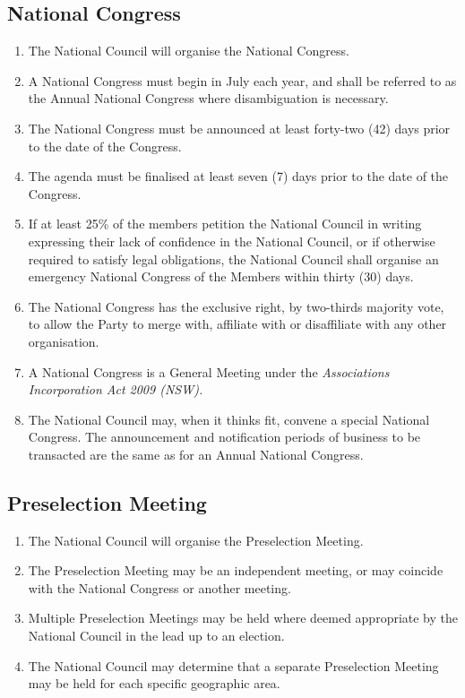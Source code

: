 \documentclass[a4paper,titlepage,8.5pt]{article}
\begin{document}
\subsection{National Congress}

\begin{enumerate}
\item The National Council will organise the National Congress.
\item A National Congress must begin in July each year, and shall be referred to as the Annual National Congress where disambiguation is necessary.
\item The National Congress must be announced at least forty-two (42) days prior to the date of the Congress.
\item The agenda must be finalised at least seven (7) days prior to the date of the Congress.
\item If at least 25\% of the members petition the National Council in writing expressing their lack of confidence in the National Council, or if otherwise required to satisfy legal obligations, the National Council shall organise an emergency National Congress of the Members within thirty (30) days.
\item The National Congress has the exclusive right, by two-thirds majority vote, to allow the Party to merge with, affiliate with or disaffiliate with any other organisation.
\item A National Congress is a General Meeting under the \textit{Associations Incorporation Act 2009 (NSW).}
\item The National Council may, when it thinks fit, convene a special National Congress. The announcement and notification periods of business to be transacted are the same as for an Annual National Congress.
\end{enumerate}

\subsection{Preselection Meeting}

\begin{enumerate}
\item The National Council will organise the Preselection Meeting.
\item The Preselection Meeting may be an independent meeting, or may coincide with the National Congress or another meeting.
\item Multiple Preselection Meetings may be held where deemed appropriate by the National Council in the lead up to an election.
\item The National Council may determine that a separate Preselection Meeting may be held for each specific geographic area.
\end{enumerate}
\end{document}
